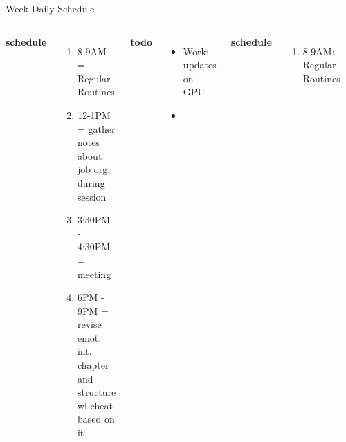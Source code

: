 \begin{frame}
\begin{columns}
\begin{column}{0.50\linewidth}
\begin{block}{Week Daily Schedule}
{\begin{columns}
          \textbf{\small schedule}\\
          \begin{enumerate} 
            \tiny \item \tiny 8-9AM = Regular Routines 
            \item \tiny 12-1PM = gather notes about job org. during
              session 
            \item \tiny 3:30PM - 4:30PM = meeting 
            \item \tiny 6PM - 9PM = revise emot. int. chapter and
              structure wl-cheat based on it 
          \end{enumerate} 
          
          \textbf{\small todo}\\ 
          \begin{itemize}
            \tiny \item \tiny Work: updates on GPU \dl{} \te{} \prio{}
          \item \tiny {} 
          \end{itemize}
          \textbf{\small schedule}\\
          \begin{enumerate}
            \tiny \item \tiny 8-9AM: Regular Routines 
          \end{enumerate}
          
          \textbf{\small todo}\\
          \begin{itemize} 
            \tiny \item \tiny
          \end{itemize}
          \textbf{\small schedule}\\ 
          \begin{enumerate}
            \tiny \item \tiny 7-7:30PM = food + organize.  
            \tiny \item \tiny 7:30PM -8PM = 
            \tiny \item \tiny 8PM -9PM = 
            \tiny \item \tiny 9:45PM - 10:30PM = go out 
            \tiny \item \tiny 2AM -3AM =  message Samir + add people
          \end{enumerate}
          

\end{columns}}
\end{block}
\end{column}
\end{columns}
\end{frame}
